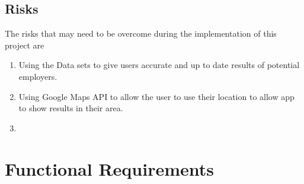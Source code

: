 \documentclass[english]{article}
\begin{document}
\subsection{Risks}

The risks that may need to be overcome during the implementation of this project are

\medskip
\begin{enumerate}

\item Using the Data sets to give users accurate and up to date results of potential employers.

\item Using Google Maps API to allow the user to use their location to allow app to show results in their area.

\color{red} \item

\end{enumerate}


\section{Functional Requirements}
\label{sec:functional_requirements}
\end{document}
